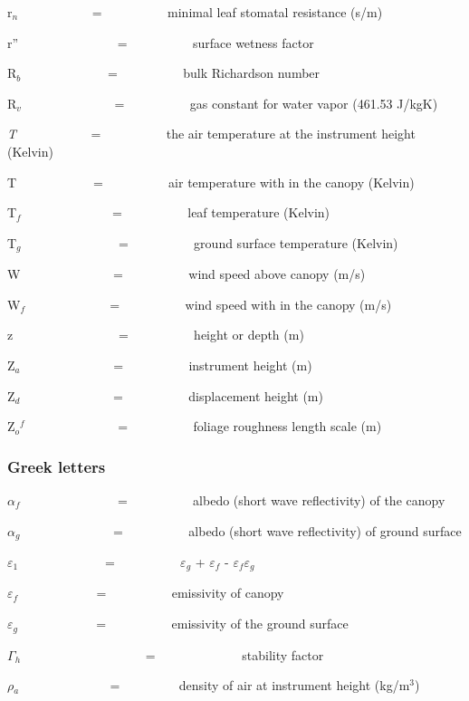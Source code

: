 r\(_{n}\)~~~~~~~~~~~ = ~~~~~~~~~ minimal leaf stomatal resistance (s/m)

r''~~~~~~~~~~~~~~~ = ~~~~~~~~~ surface wetness factor

R\(_{b}\)~~~~~~~~~~~~~ = ~~~~~~~~~ bulk Richardson number

R\(_{v}\)~~~~~~~~~~~~~~ = ~~~~~~~~~ gas constant for water vapor (461.53 J/kgK)

\emph{T\(_{ }\)}~~~~~~~~~~~ = ~~~~~~~~~ the air temperature at the instrument height (Kelvin)

T\(_{ }\) ~ ~~~~~~~~~ = ~~~~~~~~~ air temperature with in the canopy (Kelvin)

T\emph{\(_{f}\)}~~ ~~~~~~~~~~~ = ~~~~~~~~~ leaf temperature (Kelvin)

T\(_{g}\) ~~~~~~~~~~~~~~ = ~~~~~~~~~ ground surface temperature (Kelvin)

W~~~~~~~~~~~~~~ = ~~~~~~~~~ wind speed above canopy (m/s)

W\(_{f}\)~ ~~~~~~~~~~~ = ~~~~~~~~~ wind speed with in the canopy (m/s)

z~~~~~~~~~~~~~~~~ = ~~~~~~~~~ height or depth (m)

Z\(_{a}\)~~~~~~~~~~~~~~ = ~~~~~~~~~ instrument height (m)

Z\(_{d}\)~~~~~~~~~~~~~~ = ~~~~~~~~~ displacement height (m)

Z\(_{o}\)\(^{f}\)~~~~~~~~~~~~~~ = ~~~~~~~~~ foliage roughness length scale (m)

\subsubsection{Greek letters}\label{greek-letters-000}

\(\alpha\)\(_{f}\)~~~ ~~~~~~~~~~~ = ~~~~~~~~~ albedo (short wave reflectivity) of the canopy

\(\alpha\)\(_{g}\)~~~~~~~~~~~~~~ = ~~~~~~~~~ albedo (short wave reflectivity) of ground surface

\(\varepsilon\)\(_{1}\)~~~~~~~~~~~~~ = ~~~~~~~~~ \(\varepsilon\)\(_{g}\) + \(\varepsilon\)\(_{f}\)  - \(\varepsilon\)\(_{f}\)\(\varepsilon\)\(_{g}\)

\(\varepsilon\)\(_{f}\) ~~~~~~~~~~~ = ~~~~~~~~~ emissivity of canopy 

\(\varepsilon\)\(_{g}\) ~~~~~~~~~~~ = ~~~~~~~~~ emissivity of the ground surface

\(\Gamma\)\(_{h}\)~~~~~~~~~~~~~~~~~~~ = ~~~~~~~~~~~~~stability factor

\(\rho\)\(_{a}\)~ ~~~~~~~~~~~~ = ~~~~~~~~ density of air at instrument height (kg/m\(^{3}\))

